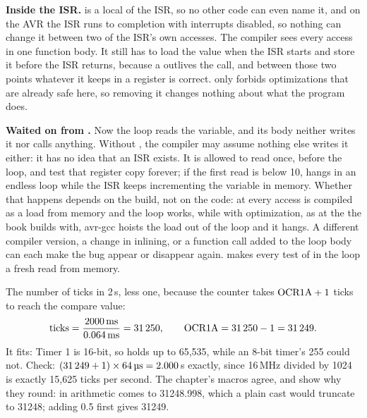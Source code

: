 \textbf{Inside the ISR.}  is a  local of the ISR, so no other code can
even name it, and on the AVR the ISR runs to completion with interrupts disabled, so nothing can
change it between two of the ISR's own accesses. The compiler sees every access in one function
body. It still has to load the value when the ISR starts and store it before the ISR returns,
because a  outlives the call, and between those two points whatever it keeps in a
register is correct.  only forbids optimizations that are already safe here, so
removing it changes nothing about what the program does.

\textbf{Waited on from .} Now the loop  reads the
variable, and its body neither writes it nor calls anything. Without , the compiler
may assume nothing else writes it either: it has no idea that an ISR exists. It is allowed to read
 once, before the loop, and test that register copy forever; if the first read is
below 10,  hangs in an endless loop while the ISR keeps incrementing the variable in
memory. Whether that happens depends on the build, not on the code: at  every access is
compiled as a load from memory and the loop works, while with optimization, as at the 
the book builds with, avr-gcc hoists the load out of the loop and it hangs. A different compiler
version, a change in inlining, or a function call added to the loop body can each make the bug
appear or disappear again.  makes every test of  in the loop a fresh
read from memory.

The number of ticks in 2\,s, less one, because the counter takes $\text{OCR1A} + 1$
ticks to reach the compare value:
\[
  \text{ticks} = \frac{2000\,\text{ms}}{0.064\,\text{ms}} = 31\,250,
  \qquad
  \text{OCR1A} = 31\,250 - 1 = 31\,249.
\]
It fits: Timer 1 is 16-bit, so  holds up to 65,535, while an 8-bit timer's 255 could
not. Check: $(31\,249 + 1) \times 64\,\text{\textmu s} = 2.000$\,s exactly, since 16\,MHz divided by
1024 is exactly 15,625 ticks per second. The chapter's macros agree, and show why they round: in
 arithmetic  comes to 31248.998, which a plain cast would
truncate to 31248; adding 0.5 first gives 31249.
